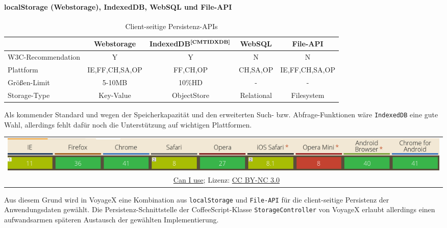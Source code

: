 \paragraph{localStorage (Webstorage), IndexedDB, WebSQL und File-API}
	\begin{table}[H]
		\centering
		\begin{tabulary}{\columnwidth}{|L|C|C|C|C|}
		\hline
			& \textbf{Webstorage} & \textbf{IndexedDB$^{\textbf{\ref{CMTIDXDB}}}$} & \textbf{WebSQL} & \textbf{File-API} \\ \hline
			W3C-Recommendation     & Y & Y & N & N \\ \hline
			Plattform     & IE,FF,CH,SA,OP & FF,CH,OP & CH,SA,OP & IE,FF,CH,SA,OP \\ \hline
			Größen-Limit     & 5-10MB & 10\%HD & - & - \\ \hline
			Storage-Type    & Key-Value & ObjectStore & Relational & Filesystem \\ \hline
		\end{tabulary}
		\caption{Client-seitige Persistenz-APIs}
	\end{table}
\addtocounter{footnote}{1}%
Als kommender Standard und wegen der Speicherkapazität und den erweiterten Such- bzw. Abfrage-Funktionen wäre \texttt{IndexedDB} eine gute Wahl, allerdings fehlt dafür noch die Unterstützung auf wichtigen Plattformen. 
	\begin{table}[H]
  		\begin{adjustwidth}{-1.5cm}{1.5cm}
		\centering
		\begin{tabulary}{20cm}{C}
	  		\includegraphics[scale=0.6]{bilder/screenshots/caniuse_indexeddb.png}\\
				\ccLogo\ 
				\begingroup
    				\fontsize{8pt}{12pt}\selectfont
    				\href{http://caniuse.com/\#search=IndexedDB}{Can I use}; Lizenz: \href{http://creativecommons.org/licenses/by-nc/3.0/}{CC BY-NC 3.0} 
				\endgroup
		\end{tabulary}
  		\end{adjustwidth}
	\end{table}
\noindent
Aus diesem Grund wird in VoyageX eine Kombination aus \texttt{localStorage} und \texttt{File-API} für die client-seitige Persistenz der Anwendungsdaten gewählt. Die Persistenz-Schnittstelle der CoffeeScript-Klasse \texttt{StorageController} von VoyageX erlaubt allerdings einen aufwandsarmen späteren Austausch der gewählten Implementierung.

